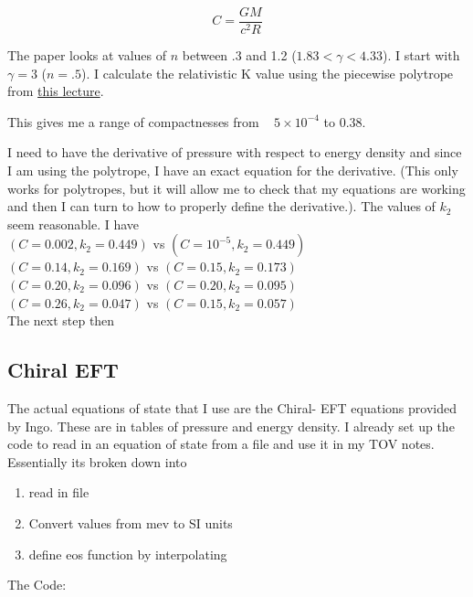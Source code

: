 \documentclass[11pt]{article}
\numberwithin{equation}{section}
\begin{document}
\begin{equation}
C = \frac{G M}{c^{2} R}
\end{equation}

The paper looks at values of $n$ between .3 and 1.2 ($1.83 < \gamma < 4.33 $). I start with $\gamma = 3$ ($n=.5$).  I calculate the relativistic K value using the piecewise polytrope from \href{https://www.ictp-saifr.org/schoolgr/Lecture2Creighton.pdf}{this lecture}.  

This gives me a range of compactnesses from ~ $5 \times 10 ^{-4}$ to 0.38.

I need to have the derivative of pressure with respect to energy density and since I am using the polytrope, I have an exact equation for the derivative.  (This only works for polytropes, but it will allow me to check that my equations are working and then I can turn to how to properly define the derivative.).  The values of $k_2$ seem reasonable.  I have \\ 
$(C = 0.002, k_2 = 0.449)$  vs  $(C = 10^{-5}, k_2 = 0.449)$ \\
$(C = 0.14, k_2 = 0.169)$  vs  $(C = 0.15, k_2 = 0.173)$ \\
$(C = 0.20, k_2 = 0.096)$  vs  $(C = 0.20, k_2 = 0.095)$ \\
$(C = 0.26, k_2 = 0.047)$  vs  $(C = 0.15, k_2 = 0.057)$ \\ 

The next step then




\subsection{Chiral EFT} 


The actual equations of state that I use are the Chiral- EFT equations provided by Ingo.  These are in tables of pressure and energy density.  I already set up the code to read in an equation of state from a file and use it in my TOV notes.   Essentially its broken down into 

\begin{enumerate}
\item read in file
\item Convert values from mev to SI units
\item define eos function by interpolating 
\end{enumerate}

The Code:
\end{document}
